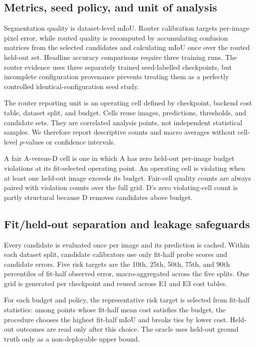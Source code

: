 \documentclass[a4paper,review,12pt]{elsarticle}
\newcommand{\miou}{mIoU}
\begin{document}
\subsection{Metrics, seed policy, and unit of analysis}

Segmentation quality is dataset-level \miou{}. Router calibration targets per-image pixel error, while routed quality is recomputed by accumulating confusion matrices from the selected candidates and calculating \miou{} once over the routed held-out set. Headline accuracy comparisons require three training runs. The router evidence uses three separately trained seed-labelled checkpoints, but incomplete configuration provenance prevents treating them as a perfectly controlled identical-configuration seed study.

The router reporting unit is an operating cell defined by checkpoint, backend cost table, dataset split, and budget. Cells reuse images, predictions, thresholds, and candidate sets. They are correlated analysis points, not independent statistical samples. We therefore report descriptive counts and macro averages without cell-level $p$-values or confidence intervals.

A fair A-versus-D cell is one in which A has zero held-out per-image budget violations at its fit-selected operating point. An operating cell is violating when at least one held-out image exceeds its budget. Fair-cell quality counts are always paired with violation counts over the full grid. D's zero violating-cell count is partly structural because D removes candidates above budget.

\subsection{Fit/held-out separation and leakage safeguards}
\label{sec:split}

Every candidate is evaluated once per image and its prediction is cached. Within each dataset split, candidate calibrators use only fit-half probe scores and candidate errors. Five risk targets are the 10th, 25th, 50th, 75th, and 90th percentiles of fit-half observed error, macro-aggregated across the five splits. One grid is generated per checkpoint and reused across E1 and E3 cost tables.

For each budget and policy, the representative risk target is selected from fit-half statistics: among points whose fit-half mean cost satisfies the budget, the procedure chooses the highest fit-half \miou{} and breaks ties by lower cost. Held-out outcomes are read only after this choice. The oracle uses held-out ground truth only as a non-deployable upper bound.
\end{document}
